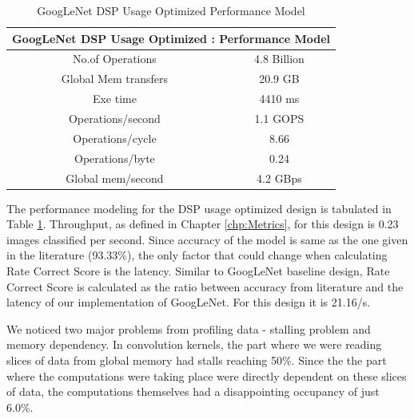 \begin{table}[!htb]                          
 \centering
    \begin{tabular}{|c|c|}
    \multicolumn{2}{c}{\textbf{GoogLeNet DSP Usage Optimized : Performance Model}} \\ \hline

     No.of Operations    &   4.8 Billion \\ \hline
      Global Mem transfers &   20.9 GB            \\ \hline          
      Exe time    &  4410 ms    \\ \hline
      Operations/second   &   1.1 GOPS \\ \hline
      Operations/cycle &   8.66             \\ \hline
      Operations/byte       &   0.24 \\ \hline
      Global mem/second & 4.2 GBps  \\ \hline

    \end{tabular}
    \caption{GoogLeNet DSP Usage Optimized Performance Model}
    \label{tab:GoogLeNetDSPPerfModel}                            

\end{table} 

The performance modeling for the DSP usage optimized design is tabulated in Table \ref{tab:GoogLeNetDSPPerfModel}. Throughput, as defined in Chapter \ref{chp:Metrics}, for this design is 0.23 images classified per second. Since accuracy of the model is same as the one given in the literature (93.33\%), the only factor that could change when calculating Rate Correct Score is the latency. Similar to GoogLeNet baseline design, Rate Correct Score is calculated as the ratio between accuracy from literature and the latency of our implementation of GoogLeNet. For this design it is 21.16/s. 

We noticed two major problems from profiling data - stalling problem and memory dependency. In convolution kernels, the part where we were reading slices of data from global memory had stalls reaching 50\%. Since the  the part where the computations were taking place were directly dependent on these slices of data, the computations themselves had a disappointing occupancy of just 6.0\%. 

